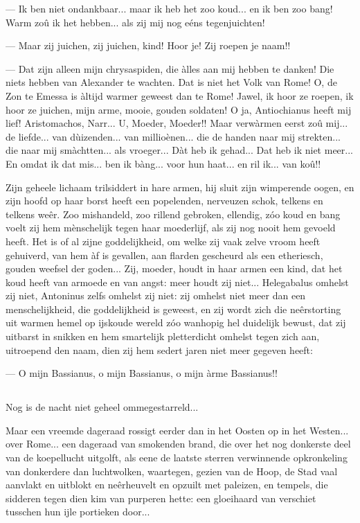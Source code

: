 \documentclass[a4paper, 12pt, oneside, dutch]{article}
\begin{document}
--- Ik ben niet ondankbaar... maar ik heb het zoo koud... en ik ben zoo bang! Warm zoû ik het hebben... als zij mij nog eéns tegenjuichten!

--- Maar zij juichen, zij juichen, kind! Hoor je! Zij roepen je naam!!

--- Dat zijn alleen mijn chrysaspiden, die àlles aan mij hebben te danken! Die niets hebben van Alexander te wachten. Dat is niet het Volk van Rome! O, de Zon te Emessa is àltijd warmer geweest dan te Rome! Jawel, ik hoor ze roepen, ik hoor ze juichen, mijn arme, mooie, gouden soldaten! O ja, Antiochianus heeft mij lief! Aristomachos, Narr... U, Moeder, Moeder!! Maar verwàrmen eerst zoû mij... de liefde... van dùizenden... van millioènen... die de handen naar mij strekten... die naar mij smàchtten... als vroeger... Dàt heb ik gehad... Dat heb ik niet meer... En omdat ik dat mis... ben ik bàng... voor hun haat... en ril ik... van koû!!

Zijn geheele lichaam trilsiddert in hare armen, hij sluit zijn wimperende oogen, en zijn hoofd op haar borst heeft een popelenden, nerveuzen schok, telkens en telkens weêr. Zoo mishandeld, zoo rillend gebroken, ellendig, zóo koud en bang voelt zij hem mènschelijk tegen haar moederlijf, als zij nog nooit hem gevoeld heeft. Het is of al zijne goddelijkheid, om welke zij vaak zelve vroom heeft gehuiverd, van hem àf is gevallen, aan flarden gescheurd als een etheriesch, gouden weefsel der goden... Zij, moeder, houdt in haar armen een kind, dat het koud heeft van armoede en van angst: meer houdt zij niet... Helegabalus omhelst zij niet, Antoninus zelfs omhelst zij niet: zij omhelst niet meer dan een menschelijkheid, die goddelijkheid is geweest, en zij wordt zich die neêrstorting uit warmen hemel op ijskoude wereld zóo wanhopig hel duidelijk bewust, dat zij uitbarst in snikken en hem smartelijk pletterdicht omhelst tegen zich aan, uitroepend den naam, dien zij hem sedert jaren niet meer gegeven heeft:

--- O mijn Bassianus, o mijn Bassianus, o mijn àrme Bassianus!!

\subsection{}
\paragraph{}
Nog is de nacht niet geheel ommegestarreld...

Maar een vreemde dageraad rossigt eerder dan in het Oosten op in het Westen... over Rome... een dageraad van smokenden brand, die over het nog donkerste deel van de koepellucht uitgolft, als eene de laatste sterren verwinnende opkronkeling van donkerdere dan luchtwolken, waartegen, gezien van de Hoop, de Stad vaal aanvlakt en uitblokt en neêrheuvelt en opzuilt met paleizen, en tempels, die sidderen tegen dien kim van purperen hette: een gloeihaard van verschiet tusschen hun ijle portieken door...
\end{document}
